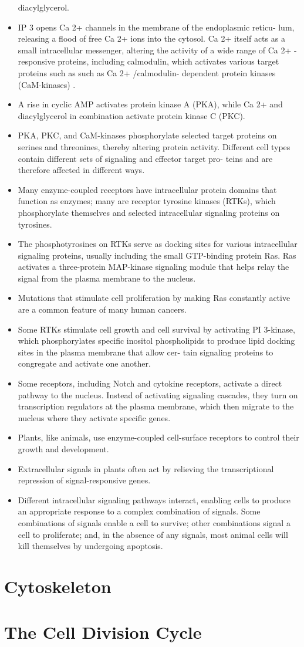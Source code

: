 \begin{itemize}
diacylglycerol.
\item IP 3 opens Ca 2+ channels in the membrane of the endoplasmic reticu-
lum, releasing a flood of free Ca 2+ ions into the cytosol. Ca 2+ itself
acts as a small intracellular messenger, altering the activity of a
wide range of Ca 2+ -responsive proteins, including calmodulin, which
activates various target proteins such as such as Ca 2+ /calmodulin-
dependent protein kinases (CaM-kinases) .
\item A rise in cyclic AMP activates protein kinase A (PKA), while Ca 2+ and
diacylglycerol in combination activate protein kinase C (PKC).
\item PKA, PKC, and CaM-kinases phosphorylate selected target proteins
on serines and threonines, thereby altering protein activity. Different
cell types contain different sets of signaling and effector target pro-
teins and are therefore affected in different ways.
\item Many enzyme-coupled receptors have intracellular protein domains
that function as enzymes; many are receptor tyrosine kinases (RTKs),
which phosphorylate themselves and selected intracellular signaling
proteins on tyrosines.
\item The phosphotyrosines on RTKs serve as docking sites for various intracellular 
signaling proteins, usually including the small GTP-binding
protein Ras. Ras activates a three-protein MAP-kinase signaling
module that helps relay the signal from the plasma membrane to the
nucleus.
\item Mutations that stimulate cell proliferation by making Ras constantly
active are a common feature of many human cancers.
\item Some RTKs stimulate cell growth and cell survival by activating PI
3-kinase, which phosphorylates specific inositol phospholipids to
produce lipid docking sites in the plasma membrane that allow cer-
tain signaling proteins to congregate and activate one another.
\item Some receptors, including Notch and cytokine receptors, activate
a direct pathway to the nucleus. Instead of activating signaling
cascades, they turn on transcription regulators at the plasma membrane, 
which then migrate to the nucleus where they activate specific
genes.
\item Plants, like animals, use enzyme-coupled cell-surface receptors to
control their growth and development.
\item Extracellular signals in plants often act by relieving the transcriptional 
repression of signal-responsive genes.
\item Different intracellular signaling pathways interact, enabling cells to
produce an appropriate response to a complex combination of signals.
Some combinations of signals enable a cell to survive; other combinations 
signal a cell to proliferate; and, in the absence of any signals,
most animal cells will kill themselves by undergoing apoptosis.
\end{itemize}

\chapter{Cytoskeleton}



\chapter{The Cell Division Cycle}
